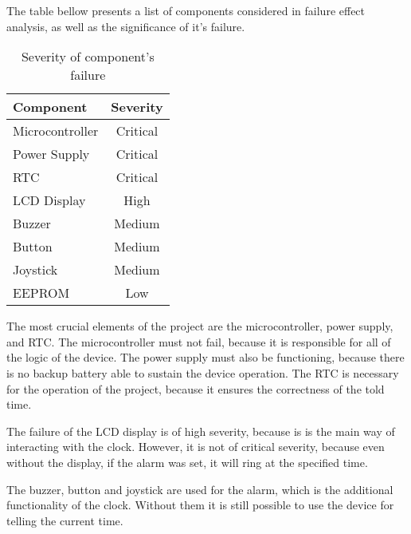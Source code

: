 \documentclass[10pt]{article}
\begin{document}
    The table bellow presents a list of components considered in failure effect analysis, as well as the significance of it's failure.

    \begin{table}[H]\centering
        \newcommand{\critical}{\color{red} Critical}
        \begin{tabular}{|l|c|}
            \hline
            \bf Component   &   \bf Severity                \\\hline
            Microcontroller &   \critical                   \\\hline
            Power Supply    &   \critical\footnotemark      \\\hline
            RTC             &   \critical                   \\\hline
            LCD Display     &   High                        \\\hline
            Buzzer          &   Medium                      \\\hline
            Button          &   Medium                      \\\hline
            Joystick        &   Medium                      \\\hline
            EEPROM          &   Low                         \\\hline
        \end{tabular}
        \caption{Severity of component's failure}
    \end{table}

    The most crucial elements of the project are the microcontroller, power supply, and RTC.
    The microcontroller must not fail, because it is responsible for all of the logic of the device.
    The power supply must also be functioning, because there is no backup battery able to sustain the device operation.
    The RTC is necessary for the operation of the project, because it ensures the correctness of the told time.

    The failure of the LCD display is of high severity, because is is the main way of interacting with the clock.
    However, it is not of critical severity, because even without the display, if the alarm was set, it will ring at the specified time.

    The buzzer, button and joystick are used for the alarm, which is the additional functionality of the clock.
    Without them it is still possible to use the device for telling the current time.
\end{document}
